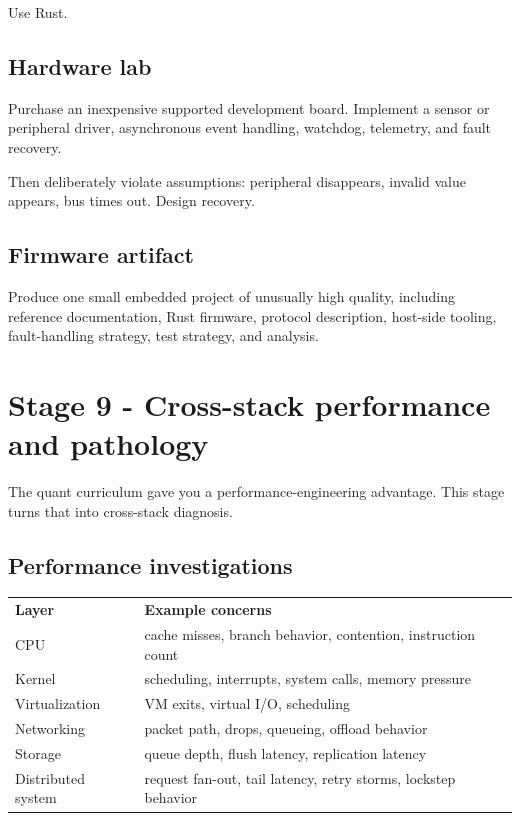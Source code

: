 \documentclass[11pt,letterpaper]{article}
\begin{document}
Use Rust.

\subsection*{Hardware lab}

Purchase an inexpensive supported development board. Implement a sensor or peripheral driver, asynchronous event handling, watchdog, telemetry, and fault recovery.

Then deliberately violate assumptions: peripheral disappears, invalid value appears, bus times out. Design recovery.

\subsection*{Firmware artifact}

Produce one small embedded project of unusually high quality, including reference documentation, Rust firmware, protocol description, host-side tooling, fault-handling strategy, test strategy, and analysis.

\section{Stage 9 - Cross-stack performance and pathology}\label{sec:13}

\label{stage:9}

The quant curriculum gave you a performance-engineering advantage. This stage turns that into cross-stack diagnosis.

\subsection*{Performance investigations}

\begin{center}
\small
\begin{tabular}{>{\raggedright\arraybackslash}p{}>{\raggedright\arraybackslash}p{}}
\textbf{Layer} & \textbf{Example concerns} \\
CPU & cache misses, branch behavior, contention, instruction count \\
Kernel & scheduling, interrupts, system calls, memory pressure \\
Virtualization & VM exits, virtual I/O, scheduling \\
Networking & packet path, drops, queueing, offload behavior \\
Storage & queue depth, flush latency, replication latency \\
Distributed system & request fan-out, tail latency, retry storms, lockstep behavior \\
\end{tabular}
\end{center}
\end{document}
